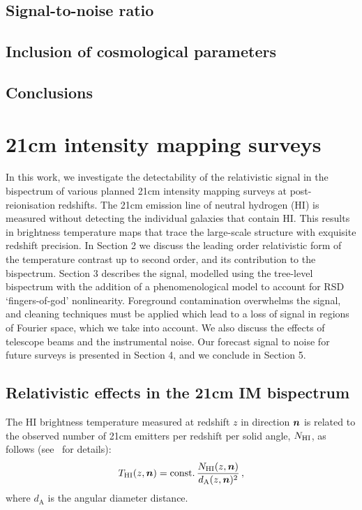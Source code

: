 \subsection{Signal-to-noise ratio}

\subsection{Inclusion of cosmological parameters}

\subsection{Conclusions}

\section{21cm intensity mapping surveys}
 In this work, we investigate the detectability of the relativistic signal in the bispectrum of various planned 21cm intensity mapping surveys at post-reionisation redshifts. 
The 21cm emission line of neutral hydrogen (HI) is measured without detecting the individual galaxies that contain HI. This results in brightness temperature maps that trace the large-scale structure with exquisite redshift precision. In Section 2 we discuss the leading order relativistic form of the temperature contrast up to second order, and its contribution to the bispectrum. Section 3 describes the signal, modelled using the tree-level bispectrum with the addition of a phenomenological model to account for RSD `fingers-of-god' nonlinearity.
Foreground contamination overwhelms the signal, and cleaning techniques must be applied which lead to a loss of signal in regions of Fourier space, which we take into account. We also discuss the effects of telescope beams and the instrumental noise. Our forecast signal to noise for future surveys is presented in Section 4, and we conclude in Section 5.

\subsection{Relativistic effects in the 21cm IM bispectrum}

The HI brightness temperature measured at redshift $z$ in direction $\bm {n}$ is related to the observed number of 21cm emitters per redshift per solid angle, $N_{{\mathrm{HI}}}$, as follows (see~\cite{Hall:2012wd,Alonso:2015uua} for details):
\begin{equation}
T_{{\mathrm{HI}}}(z,\bm {n})= \mathrm{const.}\, \frac{ N_{{\mathrm{HI}}}(z,\bm {n})}{d_\mathrm{A}(z,\bm {n})^2}\,,
\label{tobs}
\end{equation}
where $d_\mathrm{A}$ is the angular diameter distance.  

